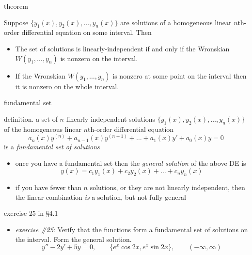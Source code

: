 \documentclass{beamer}
\begin{document}
\begin{frame}{theorem}

\begin{theorem}  Suppose $\{y_1(x),y_2(x),\dots,y_n(x)\}$ are solutions of a homogeneous linear $n$th-order differential equation on some interval.  Then
\begin{itemize}
\item The set of solutions is linearly-independent if and only if the Wronskian $W(y_1,\dots,y_n)$ is nonzero on the interval.
\item If the Wronskian $W(y_1,\dots,y_n)$ is nonzero at some point on the interval then it is nonzero on the whole interval.
\end{itemize}
\end{theorem}

\end{frame}


\begin{frame}{fundamental set}

definition.  a set of $n$ linearly-independent solutions $\{y_1(x),y_2(x),\dots,y_n(x)\}$ of the homogeneous linear $n$th-order differential equation
\begin{equation*}
    a_n(x) y^{(n)} + a_{n-1}(x) y^{(n-1)} + \dots + a_1(x) y' + a_0(x) y = 0
\end{equation*}
is a \emph{fundamental set of solutions}

\begin{itemize}
\item once you have a fundamental set then the \emph{general solution} of the above DE is
    $$y(x) = c_1 y_1(x) + c_2 y_2(x) + \dots + c_n y_n(x)$$
\item if you have fewer than $n$ solutions, or they are not linearly independent, then the linear combination \emph{is} a solution, but not fully general
\end{itemize}
\end{frame}


\begin{frame}{exercise 25 in \S 4.1}

\begin{itemize}
\item \emph{exercise \#25}:  Verify that the functions form a fundamental set  of solutions on the interval.  Form the general solution.
    $$y''-2y'+5y=0, \qquad \{e^x\cos 2x,e^x\sin 2x\}, \qquad (-\infty,\infty)$$
\end{itemize}

\vspace{50mm}
\end{frame}
\end{document}
